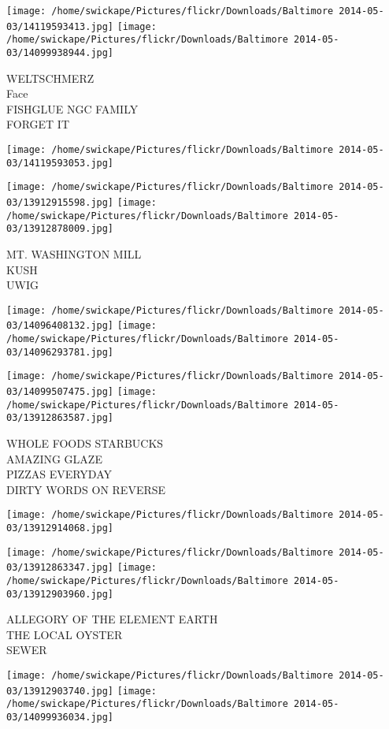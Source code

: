 \documentclass[10pt,letterpaper]{article}
\begin{document}
\texttt{[image: /home/swickape/Pictures/flickr/Downloads/Baltimore 2014-05-03/14119593413.jpg]}
\texttt{[image: /home/swickape/Pictures/flickr/Downloads/Baltimore 2014-05-03/14099938944.jpg]}

WELTSCHMERZ\\
Face\\
FISHGLUE NGC FAMILY\\
FORGET IT
\pagebreak

\texttt{[image: /home/swickape/Pictures/flickr/Downloads/Baltimore 2014-05-03/14119593053.jpg]}

\vspace{0.25in}
\texttt{[image: /home/swickape/Pictures/flickr/Downloads/Baltimore 2014-05-03/13912915598.jpg]}
\texttt{[image: /home/swickape/Pictures/flickr/Downloads/Baltimore 2014-05-03/13912878009.jpg]}

MT. WASHINGTON MILL\\
KUSH\\
UWIG
\pagebreak

\texttt{[image: /home/swickape/Pictures/flickr/Downloads/Baltimore 2014-05-03/14096408132.jpg]}
\texttt{[image: /home/swickape/Pictures/flickr/Downloads/Baltimore 2014-05-03/14096293781.jpg]}

\texttt{[image: /home/swickape/Pictures/flickr/Downloads/Baltimore 2014-05-03/14099507475.jpg]}
\texttt{[image: /home/swickape/Pictures/flickr/Downloads/Baltimore 2014-05-03/13912863587.jpg]}

WHOLE FOODS STARBUCKS\\
AMAZING GLAZE\\
PIZZAS EVERYDAY\\
DIRTY WORDS ON REVERSE
\pagebreak

\texttt{[image: /home/swickape/Pictures/flickr/Downloads/Baltimore 2014-05-03/13912914068.jpg]}

\vspace{0.25in}
\texttt{[image: /home/swickape/Pictures/flickr/Downloads/Baltimore 2014-05-03/13912863347.jpg]}
\texttt{[image: /home/swickape/Pictures/flickr/Downloads/Baltimore 2014-05-03/13912903960.jpg]}

ALLEGORY OF THE ELEMENT EARTH\\
THE LOCAL OYSTER\\
SEWER
\pagebreak

\texttt{[image: /home/swickape/Pictures/flickr/Downloads/Baltimore 2014-05-03/13912903740.jpg]}
\texttt{[image: /home/swickape/Pictures/flickr/Downloads/Baltimore 2014-05-03/14099936034.jpg]}
\end{document}
